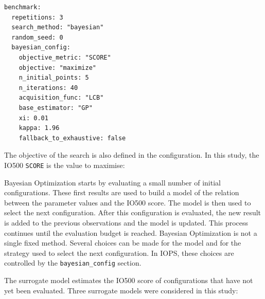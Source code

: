 
\begin{verbatim}
benchmark:
  repetitions: 3
  search_method: "bayesian"
  random_seed: 0
  bayesian_config:
    objective_metric: "SCORE"
    objective: "maximize"
    n_initial_points: 5
    n_iterations: 40
    acquisition_func: "LCB"
    base_estimator: "GP"
    xi: 0.01
    kappa: 1.96
    fallback_to_exhaustive: false
\end{verbatim}

\begin{cut}
The objective of the search is also defined in the configuration. In this
study, the IO500 \texttt{SCORE} is the value to maximise:
\end{cut}


Bayesian Optimization starts by evaluating a small number of initial
configurations. These first results are used to build a model of the
relation between the parameter values and the IO500 score. The model is
then used to select the next configuration. After this configuration is
evaluated, the new result is added to the previous observations and the
model is updated. This process continues until the evaluation budget is
reached.
Bayesian Optimization is not a single fixed method. Several choices can
be made for the model and for the strategy used to select the next
configuration. In IOPS, these choices are controlled by the
\texttt{bayesian\_config} section.

 The surrogate model estimates the IO500 score of configurations that have
not yet been evaluated. Three surrogate models were considered in this
study:

